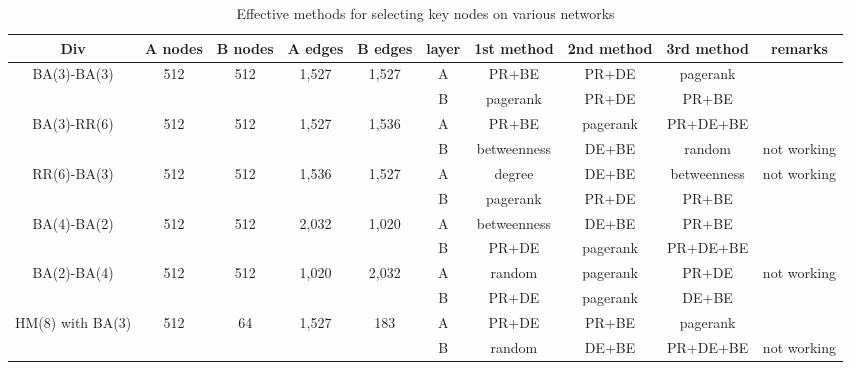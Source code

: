\begin{table}[!htb]
	\scriptsize
	\centering
	\caption{Effective methods for selecting key nodes on various networks}
	\label{effective methods}
	\begin{center}
		\begin{tabular}{c|c|c|c|c|c|c|c|c|c} \hline\hline
		  Div                              & A nodes & B nodes & A edges & B edges & layer & 1st method & 2nd method  & 3rd method  & remarks    \\ \hline \hline
         \multirow{1}{*}{BA(3)-BA(3)}      & 512 	 & 512     & 1,527   & 1,527   & A     & PR+BE      & PR+DE       & pagerank    &            \\ 
			                               &  	     &         &         &         & B     & pagerank   & PR+DE       & PR+BE       &		     \\ \hline   
	     \multirow{1}{*}{BA(3)-RR(6)}      & 512     & 512     & 1,527   & 1,536   & A     & PR+BE      & pagerank    & PR+DE+BE    &            \\
	                                       &         &         &         &         & B     & betweenness& DE+BE       & random      & not working\\ \hline
	     \multirow{1}{*}{RR(6)-BA(3)}      & 512     & 512     & 1,536   & 1,527   & A     & degree     & DE+BE       & betweenness & not working\\ 
	                                       &         &         &         &         & B     & pagerank   & PR+DE       & PR+BE       &            \\ \hline
		 \multirow{1}{*}{BA(4)-BA(2)}      & 512     & 512     & 2,032   & 1,020   & A     & betweenness& DE+BE       & PR+BE       &            \\ 
		                                   &         &         &         &         & B     & PR+DE      & pagerank    & PR+DE+BE    &            \\ \hline
		 \multirow{1}{*}{BA(2)-BA(4)}      & 512     & 512     & 1,020   & 2,032   & A     & random     & pagerank    & PR+DE       & not working\\ 
		                                   &         &         &         &         & B     & PR+DE      & pagerank    & DE+BE       &            \\ \hline
		 \multirow{1}{*}{HM(8) with BA(3)} & 512     & 64      & 1,527   & 183     & A     & PR+DE      & PR+BE       & pagerank    &            \\ 
		                                   &         &         &         &         & B     & random     & DE+BE       & PR+DE+BE    & not working\\ \hline
			\hline
		\end{tabular}
	\end{center}
\end{table}

